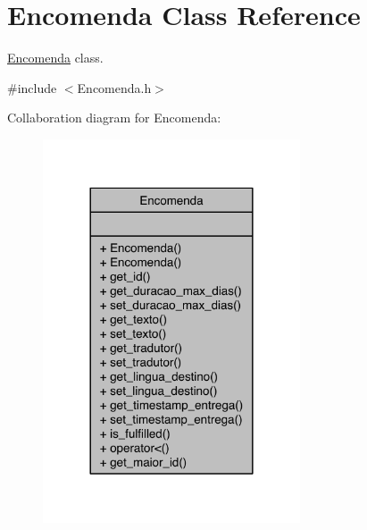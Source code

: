 \hypertarget{class_encomenda}{\section{Encomenda Class Reference}
\label{class_encomenda}
}


\hyperlink{class_encomenda}{Encomenda} class.  




{\ttfamily \#include $<$Encomenda.\-h$>$}



Collaboration diagram for Encomenda\-:
\nopagebreak
\begin{figure}[H]
\begin{center}
\leavevmode
\includegraphics[width=216pt]{class_encomenda__coll__graph}
\end{center}
\end{figure}
